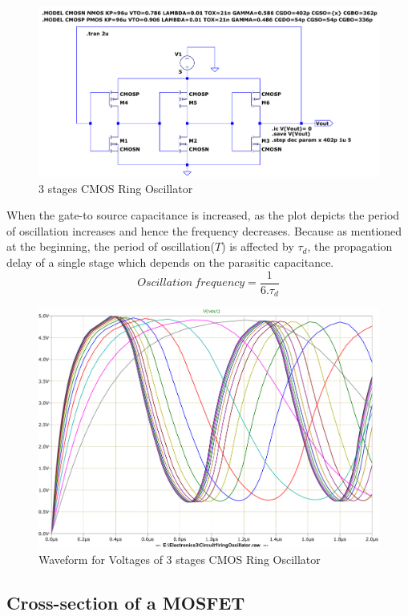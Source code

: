 \documentclass[a4paper,11pt]{article}%
\begin{document}
\begin{figure}[H]
	\centering
	\includegraphics[scale=0.6]{figures/cct1plot1}
	\caption{3 stages CMOS Ring Oscillator}
\end{figure}
\pagebreak
When the gate-to source  capacitance is increased, as the plot depicts the period of oscillation increases and hence the frequency decreases. Because as mentioned at the beginning, the period of oscillation($T$) is affected by $\tau_{d}$, the propagation delay of a single stage which depends on the parasitic capacitance.
\[
Oscillation~frequency = \frac{1}{6.\tau_{d}}
\]

\begin{figure}[H]
	\centering
	\includegraphics[scale=0.5]{figures/cct1plot2}
	\caption{Waveform for Voltages of 3 stages CMOS Ring Oscillator}
\end{figure}

\subsection{Cross-section of a MOSFET}
\end{document}
